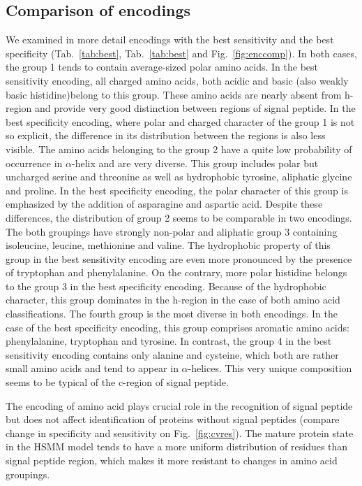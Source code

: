 \documentclass[fleqn,10pt,twoside]{gcb15submission}
\begin{document}
\subsection*{Comparison of encodings}

We examined in more detail encodings with the best sensitivity and the best specificity (Tab.~\ref{tab:best}, Tab.~\ref{tab:best} and Fig.~\ref{fig:enccomp}). In both cases, the group 1 tends to contain average-sized polar amino acids. In the best sensitivity encoding, all charged amino acids, both acidic and basic (also weakly basic histidine)belong to this group. These amino acids are nearly absent from h-region and provide very good distinction between regions of signal peptide. In the best specificity encoding, where polar and charged character of the group 1 is not so explicit, the difference in its distribution between the regions is also less visible.
The amino acids belonging to the group 2 have a quite low probability of occurrence in $\alpha$-helix and are very diverse. This group includes polar but uncharged serine and threonine as well as hydrophobic tyrosine, aliphatic glycine and proline. In the best specificity encoding, the polar character of this group is emphasized by the addition of asparagine and aspartic acid. Despite these differences, the distribution of group 2 seems to be comparable in two encodings. The both groupings have strongly non-polar and aliphatic group 3 containing isoleucine, leucine, methionine and valine. The hydrophobic property of this group in the best sensitivity encoding are even more pronounced by the presence of tryptophan and phenylalanine. On the contrary, more polar histidine belongs to the group 3 in the best specificity encoding. Because of the hydrophobic character, this group dominates in the h-region in the case of both amino acid classifications.
The fourth group is the most diverse in both encodings. In the case of the best specificity encoding, this group comprises aromatic amino acids: phenylalanine, tryptophan and tyrosine. In contrast, the group 4 in the best sensitivity encoding contains only alanine and cysteine, which both are rather small amino acids and tend to appear in $\alpha$-helices. This very unique composition seems to be typical of the c-region of signal peptide.

The encoding of amino acid plays crucial role in the recognition of signal peptide but does not affect identification of proteins without signal peptides (compare change in specificity and sensitivity on Fig.~\ref{fig:cvres}). The mature protein state in the HSMM model tends to have a more uniform distribution of residues than signal peptide region, which makes it more resistant to changes in amino acid groupings.
\end{document}
